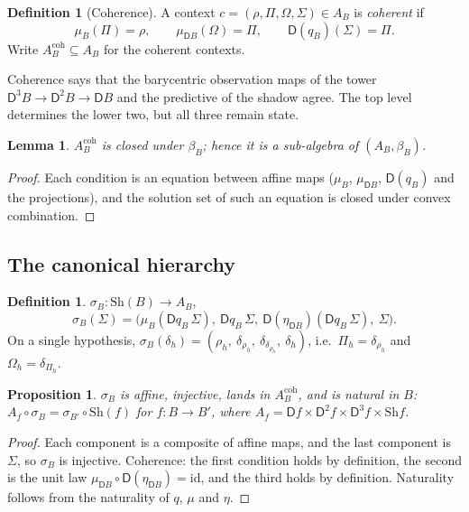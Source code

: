 \documentclass[11pt]{article}
\newtheorem{proposition}[theorem]{Proposition}
\newtheorem{lemma}[theorem]{Lemma}
\theoremstyle{definition}
\newtheorem{definition}[theorem]{Definition}
\theoremstyle{remark}
\newcommand{\D}{\mathsf{D}}
\newcommand{\Sh}{\mathrm{Sh}}
\newcommand{\id}{\mathrm{id}}
\begin{document}
\begin{definition}[Coherence]
A context $c=(\rho,\Pi,\Omega,\Sigma)\in A_B$ is \emph{coherent} if
\[
\mu_B(\Pi)=\rho,\qquad \mu_{\D B}(\Omega)=\Pi,\qquad \D(q_B)(\Sigma)=\Pi .
\]
Write $A_B^{\mathrm{coh}}\subseteq A_B$ for the coherent contexts.
\end{definition}

Coherence says that the barycentric observation maps of the tower $\D^3B\to\D^2B\to\D B$ and the
predictive of the shadow agree. The top level determines the lower two, but all three remain state.

\begin{lemma}\label{lem:coh-closed}
$A_B^{\mathrm{coh}}$ is closed under $\beta_B$; hence it is a sub-algebra of $(A_B,\beta_B)$.
\end{lemma}
\begin{proof}
Each condition is an equation between affine maps ($\mu_B$, $\mu_{\D B}$, $\D(q_B)$ and the
projections), and the solution set of such an equation is closed under convex combination.
\end{proof}

\subsection{The canonical hierarchy}

\begin{definition}
$\sigma_B\colon\Sh(B)\to A_B$,
\[
\sigma_B(\Sigma)=\big(\mu_B(\D q_B\,\Sigma),\ \D q_B\,\Sigma,\ \D(\eta_{\D B})(\D q_B\,\Sigma),\ \Sigma\big).
\]
On a single hypothesis, $\sigma_B(\delta_h)=(\rho_h,\ \delta_{\rho_h},\ \delta_{\delta_{\rho_h}},\
\delta_h)$, i.e.\ $\Pi_h=\delta_{\rho_h}$ and $\Omega_h=\delta_{\Pi_h}$.
\end{definition}

\begin{proposition}\label{prop:sigma}
$\sigma_B$ is affine, injective, lands in $A_B^{\mathrm{coh}}$, and is natural in $B$:
$A_f\circ\sigma_B=\sigma_{B'}\circ\Sh(f)$ for $f\colon B\to B'$, where
$A_f=\D f\times\D^2f\times\D^3f\times\Sh f$.
\end{proposition}
\begin{proof}
Each component is a composite of affine maps, and the last component is $\Sigma$, so $\sigma_B$ is
injective. Coherence: the first condition holds by definition, the second is the unit law
$\mu_{\D B}\circ\D(\eta_{\D B})=\id$, and the third holds by definition. Naturality follows from the
naturality of $q$, $\mu$ and $\eta$.
\end{proof}
\end{document}
